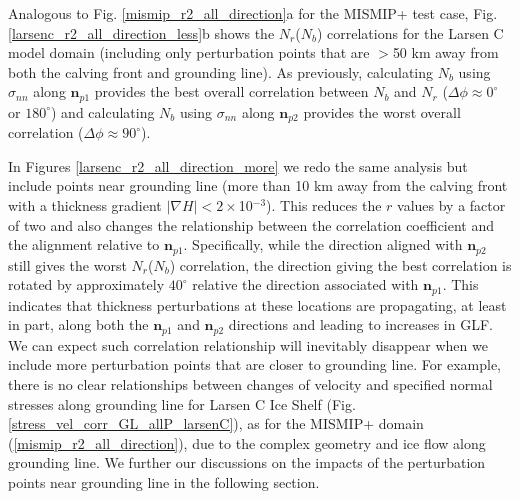 \documentclass[tc, manuscript]{copernicus}
\begin{document}
Analogous to Fig. \ref{mismip_r2_all_direction}a for the MISMIP+ test case, Fig. \ref{larsenc_r2_all_direction_less}b shows the $N_r$($N_b$) correlations for the Larsen C model domain (including only perturbation points that are $>$50 km away from both the calving front and grounding line). As previously, calculating $N_b$ using $\sigma_{nn}$ along $\mathbf{n}_{p1}$ provides the best overall correlation between $N_b$ and $N_r$ ($\Delta\phi\approx 0^\circ$ or $180 ^\circ$) and calculating $N_b$ using $\sigma_{nn}$ along $\mathbf{n}_{p2}$ provides the worst overall correlation ($\Delta\phi \approx 90^\circ$). 


In Figures \ref{larsenc_r2_all_direction_more} we redo the same analysis but include points near grounding line (more than 10 km away from the calving front with a thickness gradient $\left|\nabla H\right|< 2 \times$10$^{-3}$). This reduces the $r$ values by a factor of two and also changes the relationship between the correlation coefficient and the alignment relative to $\mathbf{n}_{p1}$. Specifically, while the direction aligned with $\mathbf{n}_{p2}$ still gives the worst $N_r$($N_b$) correlation, the direction giving the best correlation is rotated by approximately $40^\circ$ relative the direction associated with $\mathbf{n}_{p1}$. This indicates that thickness perturbations at these locations are propagating, at least in part, along both the $\mathbf{n}_{p1}$ and $\mathbf{n}_{p2}$ directions and leading to increases in GLF. We can expect such correlation relationship will inevitably disappear when we include more perturbation points that are closer to grounding line. For example, there is no clear relationships between changes of velocity and specified normal stresses along grounding line for Larsen C Ice Shelf (Fig.  \ref{stress_vel_corr_GL_allP_larsenC}), as for the MISMIP+ domain (\ref{mismip_r2_all_direction}), due to the complex geometry and ice flow along grounding line. We further our discussions on the impacts of the perturbation points near grounding line in the following section.
\end{document}
